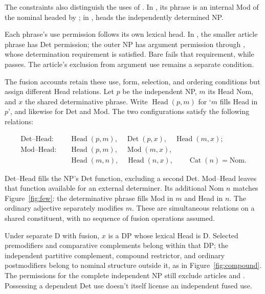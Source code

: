 \documentclass[12pt]{article}
\begin{document}
The constraints also distinguish the uses of . In , its phrase is an internal Mod of the nominal headed by ; in ,  heads the independently determined NP.

Each phrase's use permission follows its own lexical head. In , the smaller article phrase has Det permission; the outer NP has argument permission through , whose determination requirement is satisfied. Bare  fails that requirement, while  passes. The article's exclusion from argument use remains a separate condition.

The fusion accounts retain these use, form, selection, and ordering conditions but assign different Head relations. Let $p$ be the independent NP, $m$ its Head Nom, and $x$ the shared determinative phrase. Write $\operatorname{Head}(p,m)$ for \enquote*{$m$ fills Head in $p$}, and likewise for Det and Mod. The two configurations satisfy the following relations:

\[
\begin{aligned}
\text{Det--Head:}\quad
 &\operatorname{Head}(p,m),\quad \operatorname{Det}(p,x),\quad \operatorname{Head}(m,x); \\
\text{Mod--Head:}\quad
 &\operatorname{Head}(p,m),\quad \operatorname{Mod}(m,x),\\
 &\operatorname{Head}(m,n),\quad \operatorname{Head}(n,x),\qquad \operatorname{Cat}(n)=\mathrm{Nom}.
\end{aligned}
\]

Det--Head fills the NP's Det function, excluding a second Det. Mod--Head leaves that function available for an external determiner. Its additional Nom $n$ matches Figure~\ref{fig:few}: the determinative phrase fills Mod in $m$ and Head in $n$. The ordinary adjective  separately modifies $m$. These are simultaneous relations on a shared constituent, with no sequence of fusion operations assumed.

Under separate D with fusion, $x$ is a DP whose lexical Head is D. Selected premodifiers and comparative complements belong within that DP; the independent partitive complement, compound restrictor, and ordinary postmodifiers belong to nominal structure outside it, as in Figure~\ref{fig:compound}. The permissions for the complete independent NP still exclude articles and . Possessing a dependent Det use doesn't itself license an independent fused use.
\end{document}
